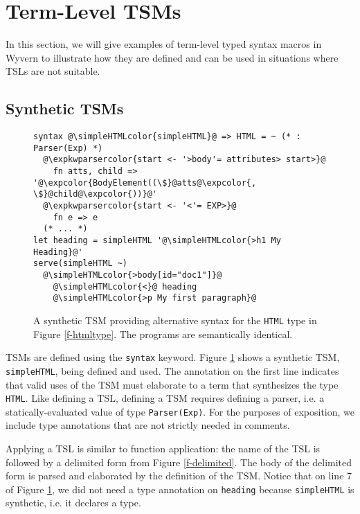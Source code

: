 \documentclass{sig-alternate}[10pt]
\newcommand{\expkwparsercolor}[1]{\textcolor[HTML]{336699}{#1}}
\newcommand{\expcolor}[1]{\textcolor[HTML]{FF0033}{#1}}
\newcommand{\simpleHTMLcolor}[1]{\textcolor[HTML]{7D5100}{#1}}
\newcommand{\mycaption}[1]{\vspace{-4px}\caption{#1}\vspace{-2px}}
\begin{document}
\section{Term-Level TSM\lowercase{s}}\label{tsms-term}
In this section, we will give examples of term-level typed syntax macros in Wyvern to illustrate how they are defined and can be used in situations where TSLs are not suitable. %


\subsection{Synthetic TSMs}

\begin{figure}[t]
\begin{lstlisting}[style=wyvern]
syntax @\simpleHTMLcolor{simpleHTML}@ => HTML = ~ (* : Parser(Exp) *)
  @\expkwparsercolor{start <- '>body'= attributes> start>}@
    fn atts, child => '@\expcolor{BodyElement((\$}@atts@\expcolor{, \$}@child@\expcolor{))}@'
  @\expkwparsercolor{start <- '<'= EXP>}@
    fn e => e
  (* ... *)
let heading = simpleHTML '@\simpleHTMLcolor{>h1 My Heading}@'
serve(simpleHTML ~)
  @\simpleHTMLcolor{>body[id="doc1"]}@
    @\simpleHTMLcolor{<}@ heading
    @\simpleHTMLcolor{>p My first paragraph}@
\end{lstlisting}
\mycaption{A synthetic TSM providing alternative syntax for the \texttt{HTML} type in Figure \ref{f-htmltype}. The programs are semantically identical.}
\label{f-simplehtml}
\end{figure}
TSMs are defined using the \verb|syntax| keyword. Figure \ref{f-simplehtml} shows a synthetic TSM, \verb|simpleHTML|, being defined and used. The annotation on the first line indicates that valid uses of the TSM must elaborate to a term that synthesizes the type \verb|HTML|. Like defining a TSL, defining a TSM requires defining a parser, i.e. a statically-evaluated value of type \verb|Parser(Exp)|. For the purposes of exposition, we include type annotations that are not strictly needed in comments. 

Applying a TSL is similar to function application: the name of the TSL is followed by a delimited form from Figure \ref{f-delimited}. The body of the delimited form is parsed and elaborated by the definition of the TSM. %
Notice that on line 7 of Figure \ref{f-simplehtml}, we did not need a type annotation on \verb|heading| because \verb|simpleHTML|  is synthetic, i.e. it declares a type.
\end{document}
